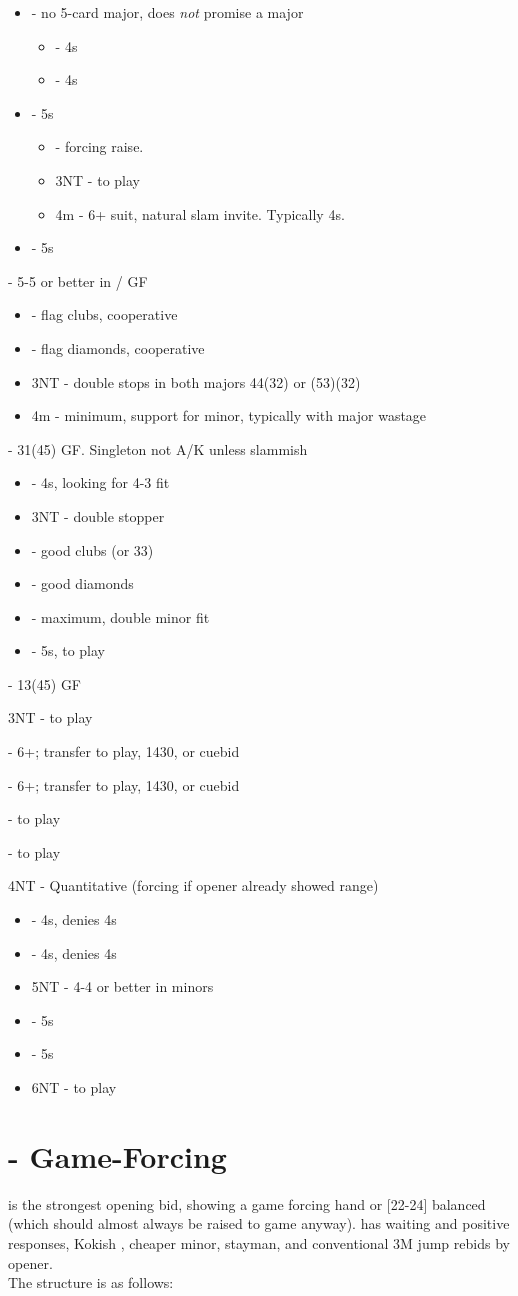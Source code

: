 \documentclass[12pt]{report}
\newcommand{\n}{\\}
\newcommand{\ul}[1]{\begin{itemize}#1\end{itemize}}
\newcommand{\li}{\item[~]}
\newcommand{\bidsection}[2]{\section{\texorpdfstring{#1}{#2}}}
\begin{document}
{        \ul {
            \li {} - no 5-card major, does \textit{not} promise a major
            \ul {
                \li \he3 - 4\sp{}s
                \li \sp3 - 4\he{}s
            }
            \li \he3 - 5\he{}s
            \ul {
                \li \sp3 - forcing \he{} raise.
                \li 3NT - to play
                \li 4m - 6+ suit, natural slam invite.  Typically 4\sp{}s.
            }
            \li \sp3 - 5\sp{}s
        }
        \li {} - 5-5 or better in \cl{}/\di{} GF
        \ul {
            \li {} - flag clubs, cooperative
            \li \sp3 - flag diamonds, cooperative
            \li 3NT - double stops in both majors 44(32) or (53)(32)
            \li 4m - minimum, support for minor, typically with major wastage
        }
        \li {} - 31(45) GF.  Singleton not A/K unless slammish
        \ul {
            \li {} - 4\sp{}s, looking for 4-3 fit
            \li 3NT - double stopper
            \li \cl4 - good clubs (or 33)
            \li \di4 - good diamonds
            \li \he4 - maximum, double minor fit
            \li \sp4 - 5\sp{}s, to play
        }
        \li {} - 13(45) GF
        \li 3NT - to play
        \li {} - 6+\he{}; transfer to play, 1430, or cuebid
        \li {} - 6+\sp{}; transfer to play, 1430, or cuebid
        \li {} - to play
        \li {} - to play
        \li 4NT - Quantitative (forcing if opener already showed range)
        \ul {
            \li {} - 4\cl{}s, denies 4\di{}s
            \li \di5 - 4\di{}s, denies 4\cl{}s
            \li 5NT - 4-4 or better in minors
            \li \cl6 - 5\cl{}s
            \li \di6 - 5\di{}s
            \li 6NT - to play
        }
    }
\bidsection{ - Game-Forcing}{2♣ - Game-Forcing} \label{2:7}

     is the strongest opening bid, showing a game forcing hand or [22-24] balanced (which should almost always be raised to game anyway).   has waiting and positive responses, Kokish , cheaper minor,  stayman, and conventional 3M jump rebids by opener.\n
    
    The structure is as follows:
\end{document}
